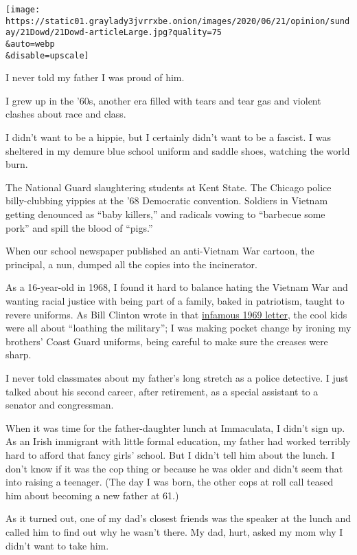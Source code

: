 \texttt{[image: https://static01.graylady3jvrrxbe.onion/images/2020/06/21/opinion/sunday/21Dowd/21Dowd-articleLarge.jpg?quality=75\\\&auto=webp\\\&disable=upscale]}

I never told my father I was proud of him.

I grew up in the '60s, another era filled with tears and tear gas and
violent clashes about race and class.

I didn't want to be a hippie, but I certainly didn't want to be a
fascist. I was sheltered in my demure blue school uniform and saddle
shoes, watching the world burn.

The National Guard slaughtering students at Kent State. The Chicago
police billy-clubbing yippies at the '68 Democratic convention. Soldiers
in Vietnam getting denounced as ``baby killers,'' and radicals vowing to
``barbecue some pork'' and spill the blood of ``pigs.''

When our school newspaper published an anti-Vietnam War cartoon, the
principal, a nun, dumped all the copies into the incinerator.

As a 16-year-old in 1968, I found it hard to balance hating the Vietnam
War and wanting racial justice with being part of a family, baked in
patriotism, taught to revere uniforms. As Bill Clinton wrote in that
\href{https://www.pbs.org/wgbh/pages/frontline/shows/clinton/etc/draftletter.html}{infamous
1969 letter}, the cool kids were all about ``loathing the military''; I
was making pocket change by ironing my brothers' Coast Guard uniforms,
being careful to make sure the creases were sharp.

I never told classmates about my father's long stretch as a police
detective. I just talked about his second career, after retirement, as a
special assistant to a senator and congressman.

When it was time for the father-daughter lunch at Immaculata, I didn't
sign up. As an Irish immigrant with little formal education, my father
had worked terribly hard to afford that fancy girls' school. But I
didn't tell him about the lunch. I don't know if it was the cop thing or
because he was older and didn't seem that into raising a teenager. (The
day I was born, the other cops at roll call teased him about becoming a
new father at 61.)

As it turned out, one of my dad's closest friends was the speaker at the
lunch and called him to find out why he wasn't there. My dad, hurt,
asked my mom why I didn't want to take him.

